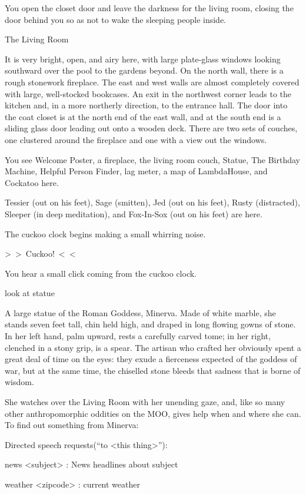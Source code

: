 \documentclass[10pt,twoside,openleft]{memoir}
\begin{document}
{You open the closet door and leave the darkness for the living room, closing the door behind you so as not to wake the sleeping people inside.

The Living Room

It is very bright, open, and airy here, with large plate-glass windows looking southward over the pool to the gardens beyond.  On the north wall, there is a rough stonework fireplace.  The east and west walls are almost completely covered with large, well-stocked bookcases.  An exit in the northwest corner leads to the kitchen and, in a more northerly direction, to the entrance hall.  The door into the coat closet is at the north end of the east wall, and at the south end is a sliding glass door leading out onto a wooden deck.  There are two sets of couches, one clustered around the fireplace and one with a view out the windows.

You see Welcome Poster, a fireplace, the living room couch, Statue, The Birthday Machine, Helpful Person Finder, lag meter, a map of LambdaHouse, and Cockatoo here.

Tessier (out on his feet), Sage (smitten), Jed (out on his feet), Rusty (distracted), Sleeper (in deep meditation), and Fox-In-Sox (out on his feet) are here.

The cuckoo clock begins making a small whirring noise.

 >~>~Cuckoo!~<~<

You hear a small click coming from the cuckoo clock.

look at statue

A large statue of the Roman Goddess, Minerva. Made of white marble, she stands seven feet tall, chin held high, and draped in long flowing gowns of stone. In her left hand, palm upward, rests a carefully carved tome; in her right, clenched in a stony grip, is a spear.  The artisan who crafted her obviously spent a great deal of time on the eyes: they exude a fierceness expected of the goddess of war, but at the same time, the chiselled stone bleeds that sadness that is borne of wisdom.

She watches over the Living Room with her unending gaze, and, like so many other anthropomorphic oddities on the MOO, gives help when and where she can.  To find out something from Minerva:

Directed speech requests(``to <this thing>''):

news <subject> : News headlines about subject

weather <zipcode> : current weather

}
\end{document}
